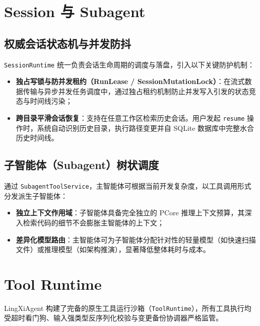 \documentclass[11pt,a4paper]{article}
\begin{document}
\section{Session 与 Subagent}

\subsection{权威会话状态机与并发防抖}
\texttt{SessionRuntime} 统一负责会话生命周期的调度与落盘，引入以下关键防护机制：
\begin{itemize}
    \item \textbf{独占写锁与防并发租约（RunLease / SessionMutationLock）}：在流式数据传输与异步并发任务调度中，通过独占租约机制防止并发写入引发的状态竞态与时间线污染；
    \item \textbf{跨目录平滑会话恢复}：支持在任意工作区检索历史会话。用户发起 \texttt{resume} 操作时，系统自动识别历史目录，执行路径变更并自 SQLite 数据库中完整水合历史时间线。
\end{itemize}

\subsection{子智能体（Subagent）树状调度}
通过 \texttt{SubagentToolService}，主智能体可根据当前开发复杂度，以工具调用形式分发派生子智能体：
\begin{itemize}
    \item \textbf{独立上下文作用域}：子智能体具备完全独立的 PCore 推理上下文预算，其深入检索代码的细节不会膨胀主智能体的上下文；
    \item \textbf{差异化模型路由}：主智能体可为子智能体分配针对性的轻量模型（如快速扫描文件）或推理模型（如架构推演），显著降低整体耗时与成本。
\end{itemize}

\section{Tool Runtime}

LingXiAgent 构建了完备的原生工具运行沙箱（\texttt{ToolRuntime}），所有工具执行均受超时看门狗、输入强类型反序列化校验与变更备份协调器严格监管。
\end{document}
